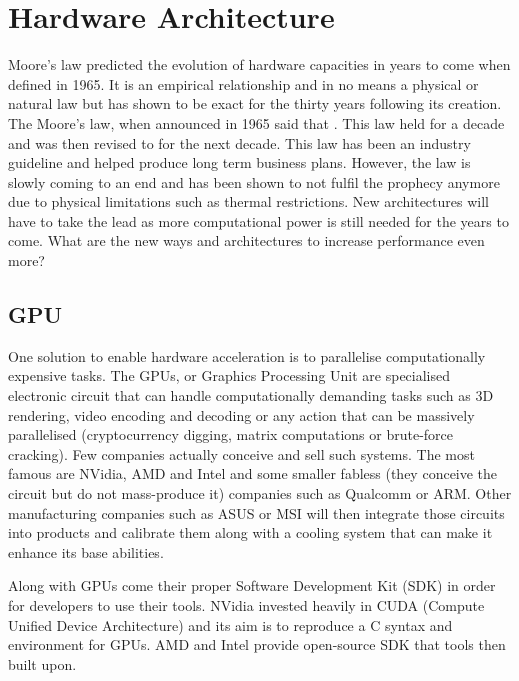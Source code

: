 \section{Hardware Architecture}

Moore's law \cite{Moore2006} predicted the evolution of hardware capacities in years to come when defined in 1965. It is an empirical relationship and in no means a physical or natural law but has shown to be exact for the thirty years following its creation. The Moore's law, when announced in 1965 said that . This law held for a decade and was then revised to  for the next decade. This law has been an industry guideline and helped produce long term business plans. However, the law is slowly coming to an end and has been shown to not fulfil the prophecy anymore due to physical limitations such as thermal restrictions. New architectures will have to take the lead as more computational power is still needed for the years to come. What are the new ways and architectures to increase performance even more?


\subsection{GPU}

One solution to enable hardware acceleration is to parallelise computationally expensive tasks. The GPUs, or Graphics Processing Unit are specialised electronic circuit that can handle computationally demanding tasks such as 3D rendering, video encoding and decoding or any action that can be massively parallelised (cryptocurrency digging, matrix computations or brute-force cracking). Few companies actually conceive and sell such systems. The most famous are NVidia, AMD and Intel and some smaller fabless (they conceive the circuit but do not mass-produce it) companies such as Qualcomm or ARM. Other manufacturing companies such as ASUS or MSI will then integrate those circuits into products and calibrate them along with a cooling system that can make it enhance its base abilities.

Along with GPUs come their proper Software Development Kit (SDK) in order for developers to use their tools. NVidia invested heavily in CUDA (Compute Unified Device Architecture) \cite{CUDA} and its aim is to reproduce a C syntax and environment for GPUs. AMD and Intel provide open-source SDK that tools then built upon.

